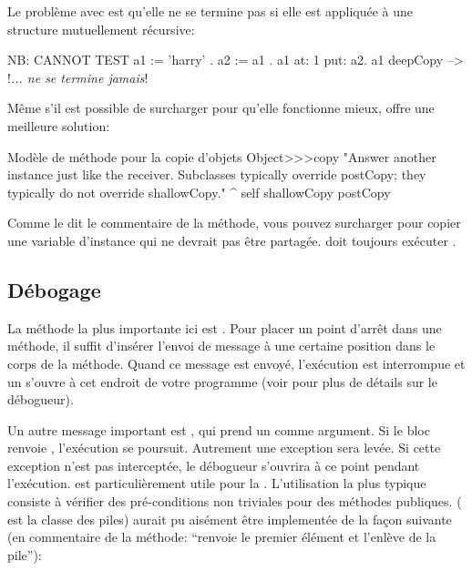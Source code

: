\documentclass[a4paper,10pt,twoside]{book}
\begin{document}
Le problème avec  est qu'elle ne se termine pas si elle est appliquée 
à une structure mutuellement récursive:

\begin{code}{NB: CANNOT TEST}
a1 := { 'harry' }.
a2 := { a1 }.
a1 at: 1 put: a2.
a1 deepCopy --> !\emph{... ne se termine jamais}!
\end{code}

Même s'il est possible de surcharger  pour qu'elle fonctionne 
mieux,  offre une meilleure solution:

\begin{method}{Modèle de méthode pour la copie d'objets}
Object>>>copy
    "Answer another instance just like the receiver.
    Subclasses typically override postCopy;
    they typically do not override shallowCopy."
    ^ self shallowCopy postCopy
\end{method}

Comme le dit le commentaire de la méthode,
vous pouvez surcharger  pour copier une variable d'instance qui ne devrait pas être partagée.  doit toujours exécuter .


\subsection{Débogage}

La méthode la plus importante ici est . Pour
placer un point d'arrêt dans une méthode, il suffit d'insérer
l'envoi de message  à une certaine position dans le
corps de la méthode.  Quand ce message est envoyé, l'exécution
est interrompue et un  s'ouvre à cet endroit de votre programme
(voir  pour plus de détails sur le débogueur).


Un autre message important est , qui prend un
 comme argument. Si le bloc renvoie , l'exécution
se poursuit. Autrement une exception sera levée. Si  cette exception
n'est pas interceptée, le débogueur s'ouvrira à ce point pendant
l'exécution.  est particulièrement utile pour la
. L'utilisation la plus typique
consiste à vérifier des pré-conditions non triviales pour des
méthodes publiques.  
( est la classe des piles)
aurait pu aisément être implementée de la façon suivante
(en commentaire de la méthode: ``renvoie le premier élément et
l'enlève de la pile''):
\end{document}

